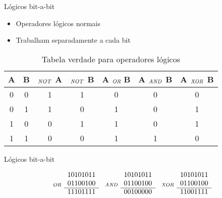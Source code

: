 \documentclass[11pt]{beamer}
\begin{document}
	\begin{frame}{Lógicos bit-a-bit}
		\begin{itemize}
			\presentationPause\item Operadores lógicos normais
			\presentationPause\item Trabalham separadamente a cada bit
		\end{itemize}
		\presentationPause
		\presentationPause\begin{table}[!h]
			\centering
			\caption{Tabela verdade para operadores lógicos}
			\label{table.truth}
			\begin{tabular}{c|c||c|c|c|c|c}
				A & B & $_\text{\emph{NOT}}$ A & $_\text{\emph{NOT}}$ B & A $_\text{\emph{OR} }$B & A $_\text{\emph{AND}}$ B & A $_\text{\emph{XOR}}$ B \\\hline
				0 & 0 & 1 & 1 & 0 & 0 & 0 \\
				0 & 1 & 1 & 0 & 1 & 0 & 1 \\
				1 & 0 & 0 & 1 & 1 & 0 & 1 \\
				1 & 1 & 0 & 0 & 1 & 1 & 0 \\
			\end{tabular}
		\end{table}
	\end{frame}\begin{frame}{Lógicos bit-a-bit}
		
		\presentationPause\begin{equation}\nonumber
			\begin{array}{cc}
				&	10101011\\
				_\text{\emph{OR}}\!	&	01100100\\\cline{2-2}
				&	11101111
			\end{array}\  
			\begin{array}{cc}
				&	10101011\\
				_\text{\emph{AND}}\!	&	01100100\\\cline{2-2}
				&	00100000
			\end{array}\
			\begin{array}{cc}
				&	10101011\\
				_\text{\emph{XOR}}\! &	01100100\\\cline{2-2}
				&	11001111
			\end{array}
		\end{equation}
	\end{frame}
\end{document}
